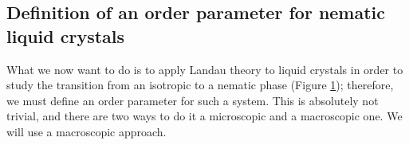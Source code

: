 \documentclass[../../Main/Main.tex]{subfiles}
\begin{document}
\begin{figure}[H]
\begin{minipage}[c]{0.5\linewidth}
\end{minipage}
\begin{minipage}[]{0.5\linewidth}
\centering
{}
\end{minipage}
\label{fig:16_9}
\end{figure}



\subsection{Definition of an order parameter for nematic liquid crystals}
What we now want to do is to apply Landau theory to liquid crystals in order to study the transition from an isotropic to a nematic phase (Figure \ref{fig:16_9}); therefore, we must define an order parameter for such a system. This is absolutely not trivial, and there are two ways to do it a microscopic and a macroscopic one. We will use a macroscopic approach.
\end{document}
